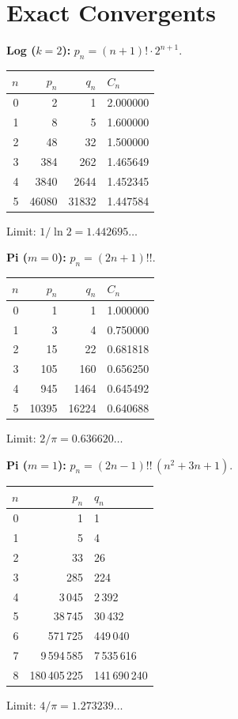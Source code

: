 \documentclass[11pt,a4paper]{article}
\theoremstyle{plain}
\theoremstyle{definition}
\theoremstyle{remark}
\newcommand{\dff}[1]{(#1)!!}
\begin{document}
\section{Exact Convergents}\label{app:conv}

\textbf{Log ($k{=}2$):} $p_n = (n{+}1)!\cdot 2^{n+1}$.

\smallskip
\begin{center}
\begin{tabular}{@{}rrrl@{}}
\toprule
$n$ & $p_n$ & $q_n$ & $C_n$ \\
\midrule
0 & 2 & 1 & 2.000000 \\
1 & 8 & 5 & 1.600000 \\
2 & 48 & 32 & 1.500000 \\
3 & 384 & 262 & 1.465649 \\
4 & 3840 & 2644 & 1.452345 \\
5 & 46080 & 31832 & 1.447584 \\
\bottomrule
\end{tabular}
\end{center}
\smallskip\noindent Limit: $1/\ln 2 = 1.442695\ldots$

\medskip
\textbf{Pi ($m{=}0$):} $p_n = (2n{+}1)!!$.

\smallskip
\begin{center}
\begin{tabular}{@{}rrrl@{}}
\toprule
$n$ & $p_n$ & $q_n$ & $C_n$ \\
\midrule
0 & 1 & 1 & 1.000000 \\
1 & 3 & 4 & 0.750000 \\
2 & 15 & 22 & 0.681818 \\
3 & 105 & 160 & 0.656250 \\
4 & 945 & 1464 & 0.645492 \\
5 & 10395 & 16224 & 0.640688 \\
\bottomrule
\end{tabular}
\end{center}
\smallskip\noindent Limit: $2/\pi = 0.636620\ldots$

\medskip
\textbf{Pi ($m{=}1$):}
$p_n = \dff{2n{-}1}\,(n^2{+}3n{+}1)$.

\smallskip
\begin{center}
\begin{tabular}{@{}rrl@{}}
\toprule
$n$ & $p_n$ & $q_n$ \\
\midrule
0 & 1 & 1 \\
1 & 5 & 4 \\
2 & 33 & 26 \\
3 & 285 & 224 \\
4 & 3\,045 & 2\,392 \\
5 & 38\,745 & 30\,432 \\
6 & 571\,725 & 449\,040 \\
7 & 9\,594\,585 & 7\,535\,616 \\
8 & 180\,405\,225 & 141\,690\,240 \\
\bottomrule
\end{tabular}
\end{center}
\smallskip\noindent Limit: $4/\pi = 1.273239\ldots$
\end{document}
